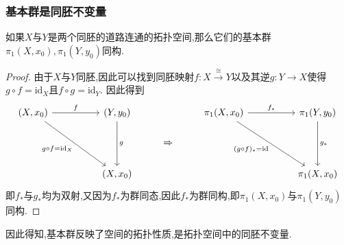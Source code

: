 \documentclass{article}
\begin{document}
\subsubsection{基本群是同胚不变量}
\begin{theorem}
    如果$X$与$Y$是两个同胚的道路连通的拓扑空间,那么它们的基本群$\pi_1(X,x_0),\pi_1(Y,y_0)$同构.
\end{theorem}
\begin{proof}
    由于$X$与$Y$同胚,因此可以找到同胚映射$f : X \xrightarrow{\cong} Y$以及其逆$g : Y \to X$使得$g \circ f = \text{id}_X$且$f \circ g = \text{id}_Y$.
    因此得到
    \[\begin{tikzcd}
        {(X,x_0)} && {(Y,y_0)} && {\pi_1(X,x_0)} && {\pi_1(Y,y_0)} \\
        &&& \Rightarrow \\
        && {(X,x_0)} &&&& {\pi_1(X,x_0)}
        \arrow["{f_*}", from=1-5, to=1-7]
        \arrow["{g_*}", from=1-7, to=3-7]
        \arrow["{(g \circ f)_*= \text{id}}"', from=1-5, to=3-7]
        \arrow["f", from=1-1, to=1-3]
        \arrow["g", from=1-3, to=3-3]
        \arrow["{g \circ f = \text{id}_X}"', from=1-1, to=3-3]
    \end{tikzcd}\]
    即$f_*$与$g_*$均为双射,又因为$f_*$为群同态,因此$f_*$为群同构,即$\pi_1(X,x_0)$与$\pi_1(Y,y_0)$同构.
\end{proof}
因此得知,基本群反映了空间的拓扑性质,是拓扑空间中的同胚不变量.
\end{document}
